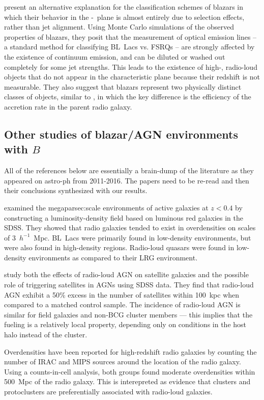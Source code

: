 \documentclass{emulateapj}
\begin{document}
\citet{gio12} present an alternative explanation for the classification schemes of blazars in which their behavior in the \nupeak-\lpeak~plane is almost entirely due to selection effects, rather than jet alignment. Using Monte Carlo simulations of the observed properties of blazars, they posit that the measurement of optical emission lines -- a standard method for classifying BL~Lacs vs. FSRQs -- are strongly affected by the existence of continuum emission, and can be diluted or washed out completely for some jet strengths. This leads to the existence of high-\nupeak, radio-loud objects that do not appear in the characteristic plane because their redshift is not measurable. They also suggest that blazars represent two physically distinct classes of objects, similar to \citet{mey11}, in which the key difference is the efficiency of the accretion rate in the parent radio galaxy. 

\subsection{Other studies of blazar/AGN environments with $B$}

{\note All of the references below are essentially a brain-dump of the literature as they appeared on astro-ph from 2011-2016. The papers need to be re-read and then their conclusions synthesized with our results.}

\citet{lie11} examined the megaparsec:scale environments of active galaxies at $z<0.4$ by constructing a luminosity-density field based on luminous red galaxies in the SDSS. They showed that radio galaxies tended to exist in overdensities on scales of 3~$h^{-1}$~Mpc. BL~Lacs were primarily found in low-density environments, but were also found in high-density regions. Radio-loud quasars were found in low-density environments as compared to their LRG environment. 

\citet{pac14} study both the effects of radio-loud AGN on satellite galaxies and the possible role of triggering satellites in AGNs using SDSS data. They find that radio-loud AGN exhibit a 50\% excess in the number of satellites within 100~kpc when compared to a matched control sample. The incidence of radio-loud AGN is similar for field galaxies and non-BCG cluster members --- this implies that the fueling is a relatively local property, depending only on conditions in the host halo instead of the cluster. 

Overdensities have been reported for high-redshift radio galaxies by counting the number of IRAC \citep{gal12} and MIPS \citep{may12} sources around the location of the radio galaxy. Using a counts-in-cell analysis, both groups found moderate overdensities within 500~Mpc of the radio galaxy. This is interepreted as evidence that clusters and protoclusters are preferentially associated with radio-loud galaxies. 
\end{document}
